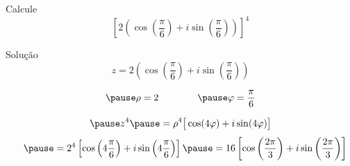 \begin{question}
  Calcule
  \[
    \left[2\left(\cos\left(\frac{\pi}{6}\right) + i\sin\left(\frac{\pi}{6}\right)\right)\right]^4
  \]
\end{question}

\begin{resolution}{Solução}
  \[
    z = 2\left(\cos\left(\frac{\pi}{6}\right) + i\sin\left(\frac{\pi}{6}\right)\right)
  \]

  \[
    \pause
    \rho = 2
    \qquad\qquad
    \pause
    \varphi = \frac{\pi}{6}
  \]

  \[
    \pause
    z^4
    \pause
    = \rho^4 \big[\cos(4\varphi) + i\sin(4\varphi)\big]
  \]
  \[
    \hphantom{z^4}
    \pause
    = 2^4 \left[\cos\left(4\frac{\pi}{6}\right) + i\sin\left(4\frac{\pi}{6}\right)\right]
    \pause
    = 16  \left[\cos\left(\frac{2\pi}{3}\right) + i\sin\left(\frac{2\pi}{3}\right)\right]
  \]
\end{resolution}

